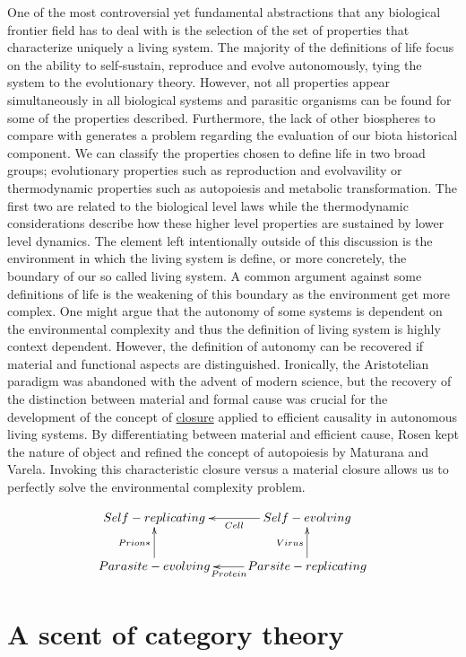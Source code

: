 \documentclass[aps,twocolumn]{revtex4-1}
\begin{document}
One of the most controversial yet fundamental abstractions that any biological frontier field has to deal with is the selection of the set of properties that characterize uniquely a living system. The majority of the definitions of life focus on the ability to self-sustain, reproduce and evolve autonomously, tying the system to the evolutionary theory. However, not all properties appear simultaneously in all biological systems and parasitic organisms can be found for some of the properties described. Furthermore, the lack of other biospheres to compare with generates a problem regarding the evaluation of our biota historical component. We can classify the properties chosen to define life in two broad groups; evolutionary properties such as reproduction and evolvavility or thermodynamic properties such as autopoiesis and metabolic transformation. The first two are related to the biological level laws while the thermodynamic considerations describe how these higher level properties are sustained by lower level dynamics. The element left intentionally outside of this discussion is the environment in which the living system is define, or more concretely, the boundary of our so called living system. A common argument against some definitions of life is the weakening of this boundary as the environment get more complex. One might argue that the autonomy of some systems is dependent on the environmental complexity and thus the definition of living system is highly context dependent. However, the definition of autonomy can be recovered if material and functional aspects are distinguished. Ironically, the Aristotelian paradigm was abandoned with the advent of modern science, but the recovery of the distinction between material and formal cause was crucial for the development of the concept of \href{http://en.wikipedia.org/wiki/Closure_(mathematics)}{closure} applied to efficient causality in autonomous living systems. By differentiating between material and efficient cause, Rosen kept the nature of object and refined the concept of autopoiesis by Maturana and Varela. Invoking this characteristic closure versus a material closure allows us to perfectly solve the environmental complexity problem.

$$ \xymatrix{
			 Self-replicating & Self-evolving \ar[l]^-{Cell}\\
			 Parasite-evolving \ar[u]^-{Prion*} & Parsite-replicating \ar[l]^-{Protein}\ar[u]^-{Virus} \\} $$
			  
\section{A scent of category theory}
\end{document}
